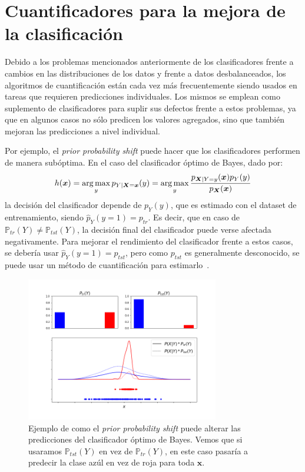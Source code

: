 \section{Cuantificadores para la mejora de la
clasificación}\label{problema:mejora}

Debido a los problemas mencionados anteriormente de los clasificadores frente a
cambios en las distribuciones de los datos y frente a datos desbalanceados, los
algoritmos de cuantificación están cada vez más frecuentemente siendo usados en
tareas que requieren predicciones individuales. Los mismos se emplean como
suplemento de clasificadores para suplir sus defectos frente a estos problemas,
ya que en algunos casos no sólo predicen los valores agregados, sino que también
mejoran las predicciones a nivel individual.

Por ejemplo, el {\it prior probability shift\/} puede hacer que los
clasificadores performen de manera subóptima. En el caso del clasificador óptimo
de Bayes, dado por:
\begin{equation}\label{ecuacion:bayes}
    h(\boldsymbol{x}) = \operatorname*{arg\,max}_{y} p_{Y|\boldsymbol{X}=\boldsymbol{x}}(y) = \operatorname*{arg\,max}_{y} \frac{p_{\boldsymbol{X}|Y=y}(\boldsymbol{x})p_Y(y)}{p_{\boldsymbol{X}}(\boldsymbol{x})}
\end{equation}
la decisión del clasificador depende de $p_Y(y)$, que es estimado con el dataset
de entrenamiento, siendo $\hat p_Y(y=1) = p_{tr}$. Es decir, que en caso de
$\mathbb{P}_{tr}(Y) \neq \mathbb{P}_{tst}(Y)$, la decisión final del
clasificador puede verse afectada negativamente. Para mejorar el rendimiento del
clasificador frente a estos casos, se debería usar $\hat p_Y(y=1) = p_{tst}$,
pero como $p_{tst}$ es generalmente desconocido, se puede usar un método de
cuantificación para estimarlo~\cite{saerens2002adjusting, alaiz2011class,
zhang2010transfer, xue2009quantification}.

\begin{figure}[H]
    \centerline{\includegraphics[width=0.75\textwidth]{../plots_teoria/bayes_classifier.png}}
    \caption{Ejemplo de como el {\it prior probability shift\/} puede alterar
    las predicciones del clasificador óptimo de Bayes. Vemos que si usaramos
    $\mathbb{P}_{tst}(Y)$ en vez de $\mathbb{P}_{tr}(Y)$, en este caso pasaría a
    predecir la clase azúl en vez de roja para toda
    $\boldsymbol{x}$.}\label{fig:bayes_classifier}
\end{figure}

